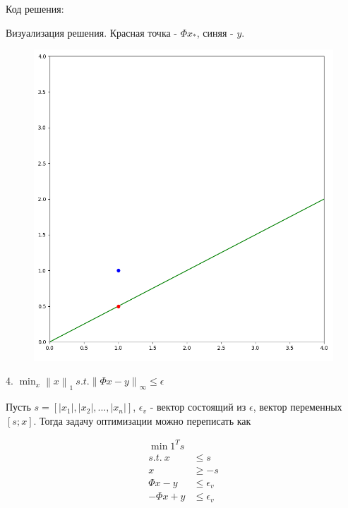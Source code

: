\documentclass{article}
\newcommand{\norm}[1]{\left\lVert#1\right\rVert}
\begin{document}
    \newpage
    Код решения:
    
    
    \newpage
    Визуализация решения. Красная точка - $\Phi x_*$, синяя - $y$.
    \begin{figure}[H]
        \includegraphics[width=0.8\linewidth]{Screenshots/task7_3.png}
    \end{figure}
    \bigbreak
    
    4. $\min_x \norm{x}_1 \: s.t. \norm{\Phi x - y}_{\infty} \le \epsilon$
    
    Пусть $s = [|x_1|, |x_2|, ..., |x_n|]$, $\epsilon_v$ - вектор состоящий из $\epsilon$, вектор переменных $[s; x]$. Тогда задачу оптимизации можно переписать как
    
    \begin{align*}
        \min 1^Ts\\
        s.t. \: x &\le s\\
        x &\ge -s\\
        \Phi x - y &\le \epsilon_v\\
        -\Phi x + y &\le \epsilon_v
    \end{align*}
    
\end{document}
